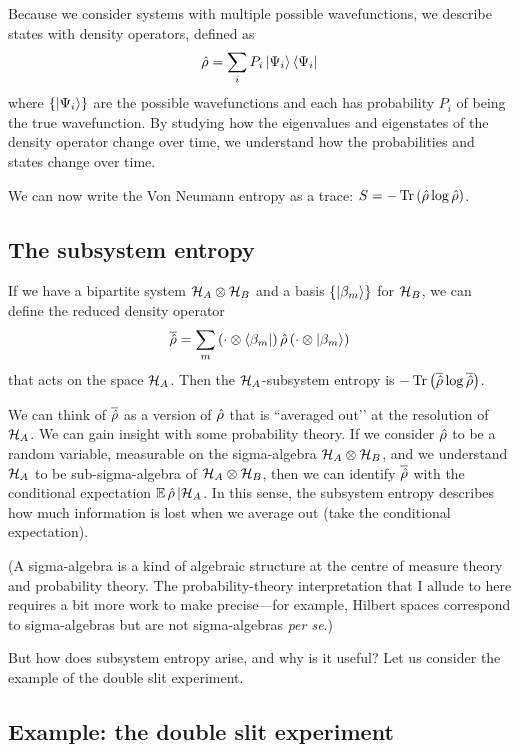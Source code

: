 Because we consider systems with multiple possible wavefunctions, we describe states with density operators, defined as
\[
\hat{\rho} = \sum_i P_i \left|\Psi_i\right\rangle\left\langle\Psi_i\right|
\]
where \(\{\left|\Psi_i\right\rangle\}\) are the possible wavefunctions and each has probability \(P_i\) of being the true wavefunction. By studying how the eigenvalues and eigenstates of the density operator change over time, we understand how the probabilities and states change over time.

We can now write the Von Neumann entropy as a trace: \(S = -\operatorname{Tr}\left(\hat{\rho} \log \hat{\rho}\right)\).

\subsection{The subsystem entropy}

If we have a bipartite system \(\mathcal{H}_A \otimes \mathcal{H}_B\) and a basis \(\{\left|\beta_m\right\rangle\}\) for \(\mathcal{H}_B\), we can define the reduced density operator
\[
\overline{\hat{\rho}} = \sum_m \left(\cdot \otimes \left\langle\beta_m\right|\right) \hat{\rho} \left(\cdot \otimes \left|\beta_m\right\rangle\right)
\]
that acts on the space \(\mathcal{H}_A\). Then the \(\mathcal{H}_A\)-subsystem entropy is \(-\operatorname{Tr}\left(\overline{\hat{\rho}}\log \overline{\hat{\rho}}\right)\).

We can think of \(\overline{\hat{\rho}}\) as a version of \(\hat{\rho}\) that is ``averaged out’’ at the resolution of \(\mathcal{H}_A\). We can gain insight with some probability theory. If we consider \(\hat{\rho}\) to be a random variable, measurable on the sigma-algebra \(\mathcal{H}_A \otimes \mathcal{H}_B\), and we understand \(\mathcal{H}_A\) to be sub-sigma-algebra of \(\mathcal{H}_A \otimes \mathcal{H}_B\), then we can identify \(\overline{\hat{\rho}}\) with the conditional expectation \(\mathbb{E}\, \hat{\rho} \,| \mathcal{H}_A\). In this sense, the subsystem entropy describes how much information is lost when we average out (take the conditional expectation).

(A sigma-algebra is a kind of algebraic structure at the centre of measure theory and probability theory. The probability-theory interpretation that I allude to here requires a bit more work to make precise---for example, Hilbert spaces correspond to sigma-algebras but are not sigma-algebras \emph{per se}.)

But how does subsystem entropy arise, and why is it useful? Let us consider the example of the double slit experiment.

\subsection{Example: the double slit experiment}\label{sec.doubleslit}


